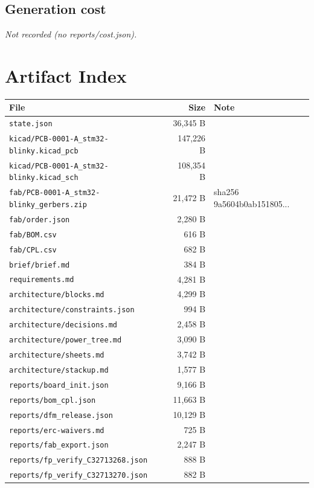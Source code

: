 \documentclass[11pt,a4paper]{article}
\begin{document}
\subsection*{Generation cost}
\emph{Not recorded (no reports/cost.json).}
\section{Artifact Index}
{\small
\begin{longtable}{p{9cm}rp{4cm}}
\toprule
\textbf{File} & \textbf{Size} & \textbf{Note} \\
\midrule
\endhead
\texttt{state.json} & 36,345 B &  \\
\texttt{kicad/PCB-0001-A\_stm32-blinky.kicad\_pcb} & 147,226 B &  \\
\texttt{kicad/PCB-0001-A\_stm32-blinky.kicad\_sch} & 108,354 B &  \\
\texttt{fab/PCB-0001-A\_stm32-blinky\_gerbers.zip} & 21,472 B & sha256 9a5604b0ab151805... \\
\texttt{fab/order.json} & 2,280 B &  \\
\texttt{fab/BOM.csv} & 616 B &  \\
\texttt{fab/CPL.csv} & 682 B &  \\
\texttt{brief/brief.md} & 384 B &  \\
\texttt{requirements.md} & 4,281 B &  \\
\texttt{architecture/blocks.md} & 4,299 B &  \\
\texttt{architecture/constraints.json} & 994 B &  \\
\texttt{architecture/decisions.md} & 2,458 B &  \\
\texttt{architecture/power\_tree.md} & 3,090 B &  \\
\texttt{architecture/sheets.md} & 3,742 B &  \\
\texttt{architecture/stackup.md} & 1,577 B &  \\
\texttt{reports/board\_init.json} & 9,166 B &  \\
\texttt{reports/bom\_cpl.json} & 11,663 B &  \\
\texttt{reports/dfm\_release.json} & 10,129 B &  \\
\texttt{reports/erc-waivers.md} & 725 B &  \\
\texttt{reports/fab\_export.json} & 2,247 B &  \\
\texttt{reports/fp\_verify\_C32713268.json} & 888 B &  \\
\texttt{reports/fp\_verify\_C32713270.json} & 882 B &  \\

\end{longtable}}
\end{document}
